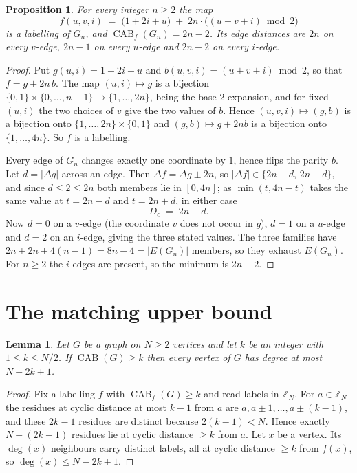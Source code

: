 \documentclass[11pt]{amsart}
\newtheorem{proposition}[theorem]{Proposition}
\newtheorem{lemma}[theorem]{Lemma}
\DeclareMathOperator{\CAB}{CAB}
\newcommand{\Dc}{D_{c}}
\begin{document}
\begin{proposition}\label{prop:lower}
For every integer $n\ge2$ the map
\begin{equation}\label{eq:f}
  f(u,v,i) \;=\; \bigl(1 + 2i + u\bigr) \;+\; 2n\cdot\bigl((u+v+i) \bmod 2\bigr)
\end{equation}
is a labelling of $G_n$, and $\CAB_f(G_n) = 2n-2$. Its edge distances are $2n$ on every $v$-edge,
$2n-1$ on every $u$-edge and $2n-2$ on every $i$-edge.
\end{proposition}

\begin{proof}
Put $g(u,i) = 1+2i+u$ and $b(u,v,i) = (u+v+i)\bmod2$, so that $f = g + 2n\,b$. The map
$(u,i)\mapsto g$ is a bijection $\{0,1\}\times\{0,\dots,n-1\}\to\{1,\dots,2n\}$, being the base-$2$
expansion, and for fixed $(u,i)$ the two choices of $v$ give the two values of $b$. Hence
$(u,v,i)\mapsto(g,b)$ is a bijection onto $\{1,\dots,2n\}\times\{0,1\}$ and
$(g,b)\mapsto g+2nb$ is a bijection onto $\{1,\dots,4n\}$. So $f$ is a labelling.

Every edge of $G_n$ changes exactly one coordinate by $1$, hence flips the parity $b$. Let
$d = |\Delta g|$ across an edge. Then $\Delta f = \Delta g \pm 2n$, so
$|\Delta f| \in \{2n-d,\,2n+d\}$, and since $d\le 2\le 2n$ both members lie in $[0,4n]$; as
$\min(t, 4n-t)$ takes the same value at $t = 2n-d$ and $t = 2n+d$, in either case
\[
  \Dc \;=\; 2n - d .
\]
Now $d = 0$ on a $v$-edge (the coordinate $v$ does not occur in $g$), $d = 1$ on a $u$-edge and
$d = 2$ on an $i$-edge, giving the three stated values. The three families have
$2n + 2n + 4(n-1) = 8n-4 = |E(G_n)|$ members, so they exhaust $E(G_n)$. For $n\ge2$ the $i$-edges
are present, so the minimum is $2n-2$.
\end{proof}

\section{The matching upper bound}

\begin{lemma}\label{lem:window}
Let $G$ be a graph on $N\ge2$ vertices and let $k$ be an integer with $1\le k\le N/2$. If
$\CAB(G)\ge k$ then every vertex of $G$ has degree at most $N-2k+1$.
\end{lemma}

\begin{proof}
Fix a labelling $f$ with $\CAB_f(G)\ge k$ and read labels in $\mathbb{Z}_N$. For $a\in\mathbb{Z}_N$
the residues at cyclic distance at most $k-1$ from $a$ are $a, a\pm1,\dots,a\pm(k-1)$, and these
$2k-1$ residues are distinct because $2(k-1) < N$. Hence exactly $N-(2k-1)$ residues lie at cyclic
distance $\ge k$ from $a$. Let $x$ be a vertex. Its $\deg(x)$ neighbours carry distinct labels, all
at cyclic distance $\ge k$ from $f(x)$, so $\deg(x)\le N-2k+1$.
\end{proof}
\end{document}
